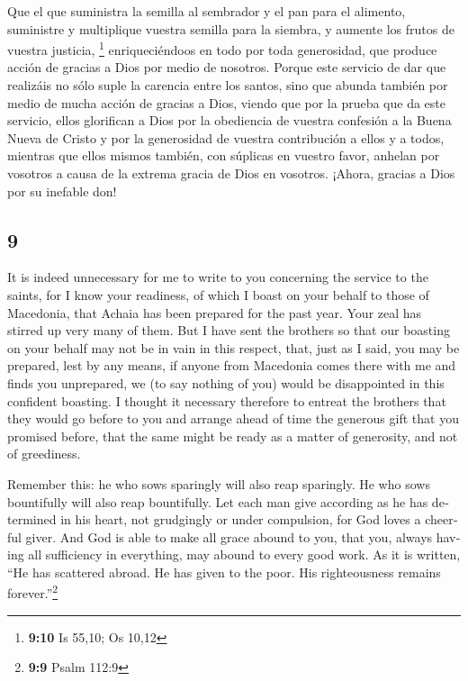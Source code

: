\begin{paracol}{2}
 Que el que suministra la semilla al sembrador y el pan
para el alimento, suministre y multiplique vuestra semilla para la
siembra, y aumente los frutos de vuestra justicia, \footnote{\textbf{9:10}
  Is 55,10; Os 10,12}  enriqueciéndoos en todo por toda
generosidad, que produce acción de gracias a Dios por medio de nosotros.
 Porque este servicio de dar que realizáis no sólo suple
la carencia entre los santos, sino que abunda también por medio de mucha
acción de gracias a Dios,  viendo que por la prueba que
da este servicio, ellos glorifican a Dios por la obediencia de vuestra
confesión a la Buena Nueva de Cristo y por la generosidad de vuestra
contribución a ellos y a todos,  mientras que ellos
mismos también, con súplicas en vuestro favor, anhelan por vosotros a
causa de la extrema gracia de Dios en vosotros.  ¡Ahora,
gracias a Dios por su inefable don!

\switchcolumn
\begin{otherlanguage}{english}

\hypertarget{section-17}{%
\section{9}\label{section-17}}

 It is indeed unnecessary for me to write to you
concerning the service to the saints,  for I know your
readiness, of which I boast on your behalf to those of Macedonia, that
Achaia has been prepared for the past year. Your zeal has stirred up
very many of them.  But I have sent the brothers so that
our boasting on your behalf may not be in vain in this respect, that,
just as I said, you may be prepared,  lest by any means,
if anyone from Macedonia comes there with me and finds you unprepared,
we (to say nothing of you) would be disappointed in this confident
boasting.  I thought it necessary therefore to entreat the
brothers that they would go before to you and arrange ahead of time the
generous gift that you promised before, that the same might be ready as
a matter of generosity, and not of greediness.

 Remember this: he who sows sparingly will also reap
sparingly. He who sows bountifully will also reap bountifully.
 Let each man give according as he has determined in his
heart, not grudgingly or under compulsion, for God loves a cheerful
giver.  And God is able to make all grace abound to you,
that you, always having all sufficiency in everything, may abound to
every good work.  As it is written, ``He has scattered
abroad. He has given to the poor. His righteousness remains
forever.''\footnote{\textbf{9:9} Psalm 112:9}


\end{otherlanguage}
\end{paracol}
